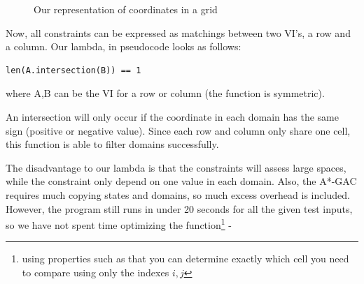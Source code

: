 \documentclass[journal]{IEEEtran}
\begin{document}
\begin{figure}[Hb]
\centering
\caption{Our representation of coordinates in a grid}
\label{fig:grid}
\end{figure}

Now, all constraints can be expressed as matchings between two VI's,
a row and a column. Our lambda, in pseudocode looks as follows:
\begin{verbatim}
len(A.intersection(B)) == 1
\end{verbatim}

where A,B can be the VI for a row or column (the function is symmetric).

An intersection will only occur if the coordinate in each domain has the same
sign (positive or negative value). Since each row and column only share one cell,
this function is able to filter domains successfully.

The disadvantage to our lambda is that the constraints will assess large spaces,
while the constraint only depend on one value in each domain. Also,
the A*-GAC requires much copying states and domains, so much excess overhead
is included. However, the program still runs in under 20 seconds for all 
the given test inputs, so we have not spent time optimizing the function\footnote{
    using properties such as that you can determine exactly which cell you need
to compare using only the indexes $i,j$}
-

%
\end{document}
